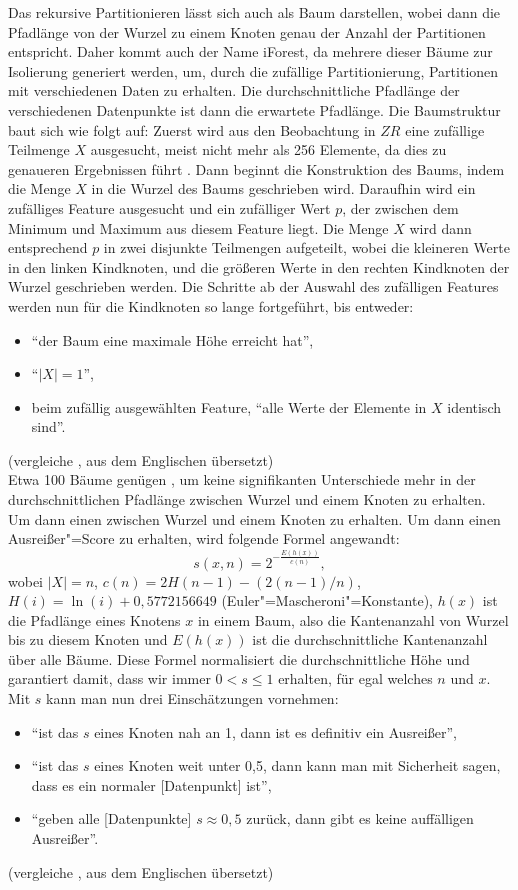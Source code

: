 Das rekursive Partitionieren lässt sich auch als Baum darstellen, wobei dann die Pfadlänge von der Wurzel zu einem Knoten genau der Anzahl der Partitionen entspricht. Daher kommt auch der Name iForest, da mehrere dieser Bäume zur Isolierung generiert werden, um, durch die zufällige Partitionierung, Partitionen mit verschiedenen Daten zu erhalten. Die durchschnittliche Pfadlänge der verschiedenen Datenpunkte ist dann die erwartete Pfadlänge. Die Baumstruktur baut sich wie folgt auf: Zuerst wird aus den Beobachtung in $ZR$ eine zufällige Teilmenge $X$ ausgesucht, meist nicht mehr als 256 Elemente, da dies zu genaueren Ergebnissen führt \cite[Ch. 4.1]{iForest}. Dann beginnt die Konstruktion des Baums, indem die Menge $X$ in die Wurzel des Baums geschrieben wird. Daraufhin wird ein zufälliges Feature ausgesucht und ein zufälliger Wert $p$, der zwischen dem Minimum und Maximum aus diesem Feature liegt. Die Menge $X$ wird dann entsprechend $p$ in zwei disjunkte Teilmengen aufgeteilt, wobei die kleineren Werte in den linken Kindknoten, und die größeren Werte in den rechten Kindknoten der Wurzel geschrieben werden. Die Schritte ab der Auswahl des zufälligen Features werden nun für die Kindknoten so lange fortgeführt, bis entweder:
\begin{itemize}
    \item "`der Baum eine maximale Höhe erreicht hat"',
    \item "`$|X|=1$"',
    \item beim zufällig ausgewählten Feature, "`alle Werte der Elemente in $X$  identisch sind"'.
\end{itemize}
(vergleiche \cite[Ch. 2]{iForest}, aus dem Englischen übersetzt) \\
Etwa 100 Bäume genügen \cite[Ch. 4.1]{iForest}, um keine signifikanten Unterschiede mehr in der durchschnittlichen Pfadlänge zwischen Wurzel und einem Knoten zu erhalten. Um dann einen zwischen Wurzel und einem Knoten zu erhalten. Um dann einen Ausreißer"=Score zu erhalten, wird folgende Formel angewandt:
\[ s(x,n)=2^{-\frac{E(h(x))}{c(n)}}, \]
wobei $|X|=n$, $c(n)=2H(n-1)-(2(n-1)/n)$, $H(i)=\ln(i) + 0,5772156649$ (Euler"=Mascheroni"=Konstante), $h(x)$ ist die Pfadlänge eines Knotens $x$ in einem Baum, also die Kantenanzahl von Wurzel bis zu diesem Knoten und $E(h(x))$ ist die durchschnittliche Kantenanzahl über alle Bäume. Diese Formel normalisiert die durchschnittliche Höhe und garantiert damit, dass wir immer $0 < s \le 1$ erhalten, für egal welches $n$ und $x$. Mit $s$ kann man nun drei Einschätzungen vornehmen:
\begin{itemize}
    \item "`ist das $s$ eines Knoten nah an 1, dann ist es definitiv ein Ausreißer"',
    \item "`ist das $s$ eines Knoten weit unter 0,5, dann kann man mit Sicherheit sagen, dass es ein normaler [Datenpunkt] ist"',
    \item "`geben alle [Datenpunkte] $s \approx 0,5$ zurück, dann gibt es keine auffälligen Ausreißer"'.
\end{itemize}
(vergleiche \cite[Ch. 2]{iForest}, aus dem Englischen übersetzt)

